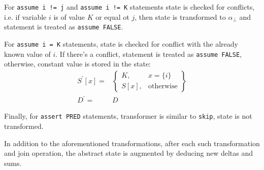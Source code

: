 For \texttt{assume i != j} and \texttt{assume i != K} statements state is checked for conflicts, i.e. if variable $i$ is of value $K$ or equal ot $j$, then state is transformed to $\alpha_\bot$ and statement is treated as \texttt{assume FALSE}.

For \texttt{assume i = K} statements, state is checked for conflict with the already known value of $i$. If there's a conflict, statement is treated as \texttt{assume FALSE}, otherwise, constant value is stored in the state:
\begin{align*}
S^\prime[x] = & \left.
	\begin{cases}
		K, & x = \{i\} \\
		S[x], & \text{otherwise}
	\end{cases}
\right\}\\
D^\prime= & D
\end{align*}


Finally, for \texttt{assert PRED} statements, transformer is similar to \texttt{skip}, state is not transformed.

In addition to the aforementioned transformations, after each such transformation and join operation, the abstract state is augmented by deducing new deltas and sums.

